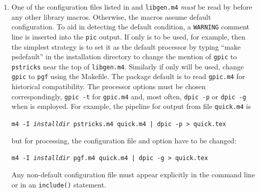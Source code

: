 \begin{enumerate}

\item
{}%
  One of the configuration files
  listed in  and {\tt libgen.m4}
  {\em must} be read by \Mfour before any other library macros.
  Otherwise, the macros assume default configuration.
  To aid in detecting the default condition, a {\tt WARNING}
  comment line is inserted into the {\tt pic} output.
  If only \PSTricks is to be used, for example, then
  the simplest strategy is to set it as the default processor by 
  typing ``make psdefault'' in the installation directory to
  change the mention of {\tt gpic} to {\tt pstricks}
  near the top of {\tt libgen.m4}.
  Similarly if only \TPGF will be used, change {\tt gpic} to {\tt pgf}
  using the Makefile.
  The package default is to read {\tt gpic.m4} for historical compatibility.
  The processor options must be chosen correspondingly,
  {\tt gpic -t} for {\tt gpic.m4} and, most often,
  {\tt dpic -p} or {\tt dpic -g} when \dpic is employed.
  For example, the pipeline for \PSTricks output from file {\tt quick.m4} is

  {\tt m4 -I {\sl installdir} pstricks.m4 quick.m4 | dpic -p > quick.tex}

  \noindent%
  but for \TPGF processing, the configuration file and \dpic option have to
  be changed:
  
  {\tt m4 -I {\sl installdir} pgf.m4 quick.m4 | dpic -g > quick.tex}

  Any non-default configuration file must appear explicitly in the command
  line or in an {\tt include()} statement.

\end{enumerate}
